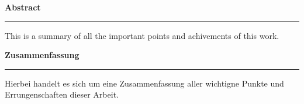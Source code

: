 
\begin{addmargin}[0cm]{0cm}
		\begin{center}
			\LARGE{\textbf{Abstract}}\\
			\rule{\textwidth}{0.04cm}	
		\end{center}

This is a summary of all the important points and achivements of this work.

\vspace{1cm}  

\begin{center}
			\LARGE{\textbf{Zusammenfassung}}\\
			\rule{\textwidth}{0.04cm}	
		\end{center}

Hierbei handelt es sich um eine Zusammenfassung aller wichtigne Punkte und Errungenschaften dieser Arbeit.

\end{addmargin}
\cleardoublepage